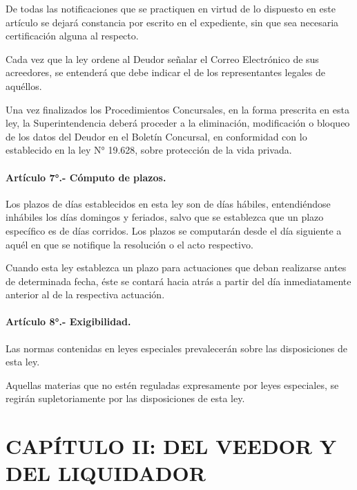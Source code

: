 \documentclass[
]{book}
\begin{document}
De todas las notificaciones que se practiquen en virtud de lo dispuesto en este artículo se dejará constancia por escrito en el expediente, sin que sea necesaria certificación alguna al respecto.

Cada vez que la ley ordene al Deudor señalar el Correo Electrónico de sus acreedores, se entenderá que debe indicar el de los representantes legales de aquéllos.

Una vez finalizados los Procedimientos Concursales, en la forma prescrita en esta ley, la Superintendencia deberá proceder a la eliminación, modificación o bloqueo de los datos del Deudor en el Boletín Concursal, en conformidad con lo establecido en la ley N° 19.628, sobre protección de la vida privada.

\hypertarget{artuxedculo-7.--cuxf3mputo-de-plazos.}{%
\paragraph*{Artículo 7°.- Cómputo de plazos.}\label{artuxedculo-7.--cuxf3mputo-de-plazos.}}

Los plazos de días establecidos en esta ley son de días hábiles, entendiéndose inhábiles los días domingos y feriados, salvo que se establezca que un plazo específico es de días corridos. Los plazos se computarán desde el día siguiente a aquél en que se notifique la resolución o el acto respectivo.

Cuando esta ley establezca un plazo para actuaciones que deban realizarse antes de determinada fecha, éste se contará hacia atrás a partir del día inmediatamente anterior al de la respectiva actuación.

\hypertarget{artuxedculo-8.--exigibilidad.}{%
\paragraph*{Artículo 8°.- Exigibilidad.}\label{artuxedculo-8.--exigibilidad.}}

Las normas contenidas en leyes especiales prevalecerán sobre las disposiciones de esta ley.

Aquellas materias que no estén reguladas expresamente por leyes especiales, se regirán supletoriamente por las disposiciones de esta ley.

\hypertarget{capuxedtulo-ii-del-veedor-y-del-liquidador}{%
\section*{CAPÍTULO II: DEL VEEDOR Y DEL LIQUIDADOR}\label{capuxedtulo-ii-del-veedor-y-del-liquidador}}
\end{document}
